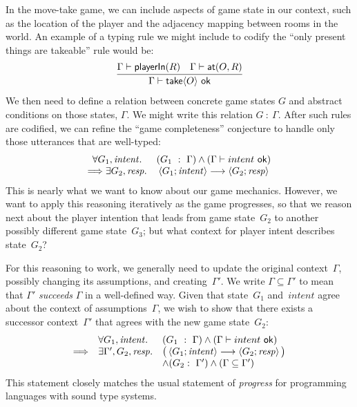   In the move-take game, we can include aspects of game state in our
  context, such as the location of the player and the adjacency mapping
  between rooms in the world. An example of a typing rule we might include
  to codify the ``only present things are takeable'' rule would be:
  \[
    \infer
    { 
      \Gamma \vdash \ctake\param{O}\ \syn{ok}
    }
    {
      \Gamma \vdash \syn{playerIn}(R)
      \quad
      \Gamma \vdash \syn{at}(O, R)
    }
  \]
  We then need to define a relation between concrete game states $G$ and
  abstract conditions on those states, $\Gamma$. We might write this
  relation $G\ :\ \Gamma$.
  After such rules are codified, we can refine the ``game completeness''
  conjecture to handle only those utterances that are well-typed:
  \[
  \begin{array}{cc}
  \forall G_1, \mathit{intent}.
  & (G_1\ :\ \Gamma)
    \land
    (\Gamma \vdash intent\ \mathsf{ok})
  \\
\Longrightarrow
  \exists G_2, \mathit{resp}.
  &\left< G_1; \mathit{intent} \right> \longrightarrow \left< G_2; \mathit{resp} \right>
  \end{array}
  \]
  This is nearly what we want to know about our game mechanics.
  However, we want to apply this reasoning iteratively as the game progresses, so that we
  reason next about the player intention that leads from game state~$G_2$
  to another possibly different game state~$G_3$; but what context for player intent describes state~$G_2$?
  
  For this reasoning to work, we generally need to update the original context~$\Gamma$,
  possibly changing its assumptions, and creating~$\Gamma'$.  We write $\Gamma \subseteq \Gamma'$ to mean that $\Gamma'$ \emph{succeeds} $\Gamma$ in a well-defined way. 
  Given that state~$G_1$ and~\ensuremath{\mathit{intent}} agree about the context of assumptions~$\Gamma$, we wish to show that there exists a successor context~$\Gamma'$ that agrees with the new game state~$G_2$:
  \[
  \begin{array}{lll}
&
  \forall G_1, \mathit{intent}.
  & (G_1\ :\ \Gamma)
    \land
    (\Gamma \vdash intent\ \mathsf{ok})
\\
\Longrightarrow &
 \exists \Gamma', G_2, \mathit{resp}.
  &
  \big( \left< G_1; \mathit{intent} \right> \longrightarrow \left< G_2; \mathit{resp} \right>
  \big)
\\
&&
\wedge 
  (G_2  :\ \Gamma') 
\wedge 
  (\Gamma \subseteq \Gamma') 
  \end{array}
  \]
  This statement closely matches the usual statement of
  \emph{progress} for programming languages with sound type systems.

